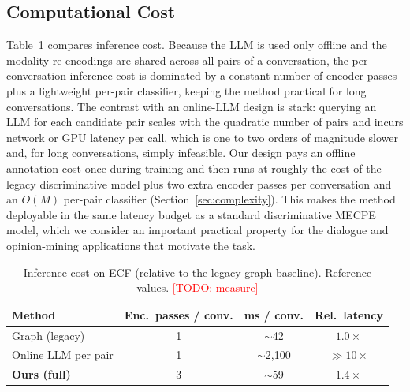 \documentclass[journal]{IEEEtran}
\newcommand{\todo}[1]{\textcolor{red}{[TODO: #1]}}
\begin{document}
\subsection{Computational Cost}
Table~\ref{tab:cost} compares inference cost. Because the LLM is used only offline and the
modality re-encodings are shared across all pairs of a conversation, the per-conversation
inference cost is dominated by a constant number of encoder passes plus a lightweight per-pair
classifier, keeping the method practical for long conversations. %
The contrast with an online-LLM design is stark: querying an LLM for each candidate pair scales
with the quadratic number of pairs and incurs network or GPU latency per call, which is one to
two orders of magnitude slower and, for long conversations, simply infeasible. Our design pays
an offline annotation cost once during training and then runs at roughly the cost of the legacy
discriminative model plus two extra encoder passes per conversation and an $O(M)$ per-pair
classifier (Section~\ref{sec:complexity}). This makes the method deployable in the same
latency budget as a standard discriminative MECPE model, which we consider an important
practical property for the dialogue and opinion-mining applications that motivate the task.
\begin{table}[t]
\centering
\caption{Inference cost on ECF (relative to the legacy graph baseline). Reference values.
\todo{measure}}
\label{tab:cost}
\setlength{\tabcolsep}{4pt}
\begin{tabular}{lccc}
\toprule
Method & Enc.\ passes / conv. & ms / conv. & Rel.\ latency \\
\midrule
Graph (legacy)        & 1 & $\sim$42  & $1.0\times$ \\
Online LLM per pair   & 1 & $\sim$2{,}100 & $\gg 10\times$ \\
\textbf{Ours (full)}  & 3 & $\sim$59  & $1.4\times$ \\
\bottomrule
\end{tabular}
\end{table}
\end{document}
